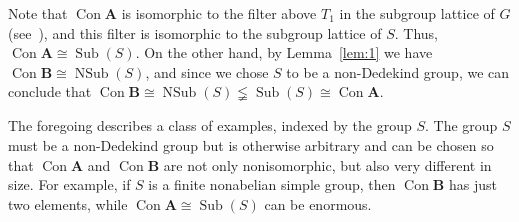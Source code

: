 \documentclass{au}
\theoremstyle{plain}
\theoremstyle{definition}
\theoremstyle{remark}
\newcommand{\<}{\ensuremath{\langle}}
\renewcommand{\>}{\ensuremath{\rangle}}
\newcommand{\bA}{\ensuremath{\mathbf{A}}}
\newcommand{\bB}{\ensuremath{\mathbf{B}}}
\renewcommand{\lneq}{\ensuremath{\lneqq}}
\newcommand{\Con}{\ensuremath{\operatorname{Con}}}
\newcommand{\Sub}{\ensuremath{\operatorname{Sub}}}
\newcommand{\NSub}{\ensuremath{\operatorname{NSub}}}
\begin{document}
Note that $\Con \bA$ is isomorphic to
the filter above $T_1$ in the subgroup lattice of $G$ 
(see~\cite[Lemma 4.20]{alvi:1987}), and this filter is isomorphic to %
the subgroup lattice of $S$. 
Thus, $\Con \bA\cong \Sub(S)$.
On the other hand, by
Lemma~\ref{lem:1} we have $\Con \bB \cong \NSub(S)$, and since we chose $S$ to
be a non-Dedekind group, we can conclude that 
$\Con \bB \cong\NSub(S) \lneq\Sub(S) \cong  \Con \bA$. 

The foregoing describes a class of examples, indexed by the group $S$.  The
group $S$ must be a non-Dedekind group but is otherwise arbitrary and can be
chosen so that $\Con\bA$ and $\Con\bB$ are not only nonisomorphic, but also 
very different in size. For example, if $S$ is a finite nonabelian simple
group, then $\Con\bB$ has just two elements, while
$\Con \bA \cong \Sub(S)$ can be enormous.
\end{document}
